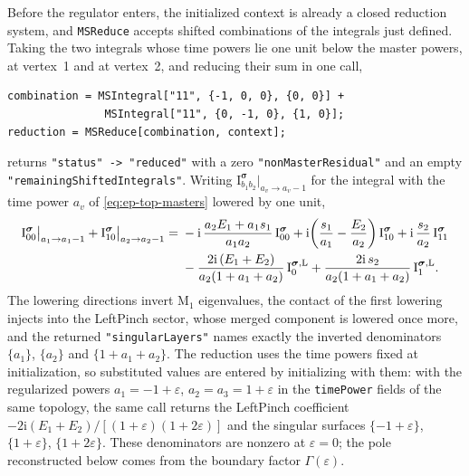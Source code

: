 \documentclass[11pt,a4paper]{article}
\numberwithin{table}{section}
\newcommand{\ii}{\mathrm i}
\begin{document}
Before the regulator enters, the initialized context is already a closed reduction
system, and \texttt{MSReduce} accepts shifted combinations of the integrals just defined.
Taking the two integrals whose time powers lie one unit below the master powers, at
vertex~1 and at vertex~2, and reducing their sum in one call,
\begin{verbatim}
combination = MSIntegral["11", {-1, 0, 0}, {0, 0}] +
               MSIntegral["11", {0, -1, 0}, {1, 0}];
reduction = MSReduce[combination, context];
\end{verbatim}
returns \texttt{"status" -> "reduced"} with a zero \texttt{"nonMasterResidual"} and an
empty \texttt{"remainingShiftedIntegrals"}. Writing
$\text{I}^{\boldsymbol\sigma}_{b_1b_2}\big|_{a_v\to a_v-1}$ for the integral with the
time power $a_v$ of \eqref{eq:ep-top-masters} lowered by one unit,
\begin{equation}
 \begin{aligned}
 \text{I}^{\boldsymbol\sigma}_{00}\big|_{a_1\to a_1-1}
 +\text{I}^{\boldsymbol\sigma}_{10}\big|_{a_2\to a_2-1}
 ={}&-\ii\,\frac{a_2E_1+a_1s_1}{a_1a_2}\,\text{I}^{\boldsymbol\sigma}_{00}
 +\ii\!\left(\frac{s_1}{a_1}-\frac{E_2}{a_2}\right)\text{I}^{\boldsymbol\sigma}_{10}
 +\ii\,\frac{s_2}{a_2}\,\text{I}^{\boldsymbol\sigma}_{11}\\
 &-\frac{2\ii\,(E_1+E_2)}{a_2(1+a_1+a_2)}\,\text{I}^{\boldsymbol\sigma,\rm L}_{0}
 +\frac{2\ii\,s_2}{a_2(1+a_1+a_2)}\,\text{I}^{\boldsymbol\sigma,\rm L}_{1}.
 \end{aligned}
 \label{eq:ep-reduction-demo}
\end{equation}
The lowering directions invert $\text{M}_1$ eigenvalues, the contact of the first lowering
injects into the LeftPinch sector, whose merged component is lowered once more, and the
returned \texttt{"singularLayers"} names exactly the inverted denominators $\{a_1\}$,
$\{a_2\}$ and $\{1+a_1+a_2\}$. The reduction uses the time powers fixed at
initialization, so substituted values are entered by initializing with them: with the
regularized powers $a_1=-1+\varepsilon$, $a_2=a_3=1+\varepsilon$ in the
\texttt{timePower} fields of the same topology, the same call returns the LeftPinch
coefficient $-2\ii(E_1+E_2)/[(1+\varepsilon)(1+2\varepsilon)]$ and the singular surfaces
$\{-1+\varepsilon\}$, $\{1+\varepsilon\}$, $\{1+2\varepsilon\}$.
These denominators are nonzero at $\varepsilon=0$; the pole reconstructed below
comes from the boundary factor $\Gamma(\varepsilon)$.
\end{document}
